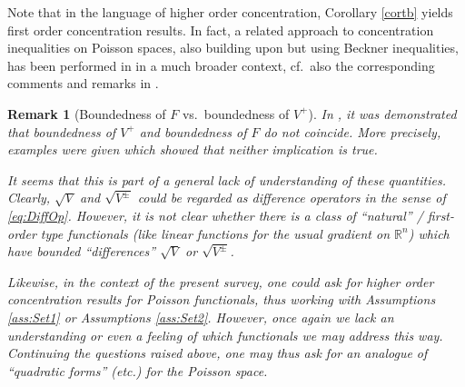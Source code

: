 \documentclass[a4paper,12pt]{amsart}
\numberwithin{equation}{section}
\newtheorem{bemerkung}[satz]{Remark}
\theoremstyle{remark}
\def\R{{\mathbb R}}
\begin{document}
Note that in the language of higher order concentration, Corollary \ref{cortb} yields first order concentration results. In fact, a related approach to concentration inequalities on Poisson spaces, also building upon \cite{BBLM05} but using Beckner inequalities, has been performed in \cite{APS22} in a much broader context, cf.\ also the corresponding comments and remarks in \cite{GST21}.

\begin{bemerkung}[Boundedness of $F$ vs.\ boundedness of $V^+$]\label{rm:BoundVF}
In \cite[Rem.\ 4.5]{GST21}, it was demonstrated that boundedness of $V^+$ and boundedness of $F$ do not coincide. More precisely, examples were given which showed that neither implication is true.

It seems that this is part of a general lack of understanding of these quantities. Clearly, $\sqrt{V}$ and $\sqrt{V^\pm}$ could be regarded as difference operators in the sense of \eqref{eq:DiffOp}. However, it is not clear whether there is a class of ``natural'' / first-order type functionals (like linear functions for the usual gradient on $\R^n$) which have bounded ``differences'' $\sqrt{V}$ or $\sqrt{V^\pm}$.

Likewise, in the context of the present survey, one could ask for higher order concentration results for Poisson functionals, thus working with Assumptions \ref{ass:Set1} or Assumptions \ref{ass:Set2}. However, once again we lack an understanding or even a feeling of which functionals we may address this way. Continuing the questions raised above, one may thus ask for an analogue of ``quadratic forms'' (etc.) for the Poisson space.
\end{bemerkung}
\end{document}
